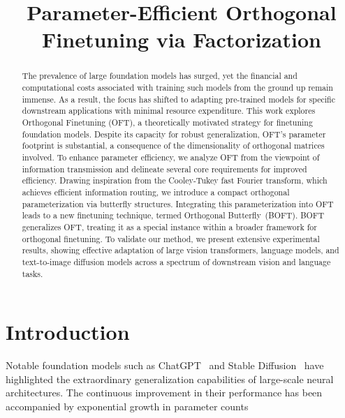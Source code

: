 \title{Parameter-Efficient Orthogonal Finetuning via Factorization}

\begin{abstract}
The prevalence of large foundation models has surged, yet the financial and computational costs associated with training such models from the ground up remain immense. As a result, the focus has shifted to adapting pre-trained models for specific downstream applications with minimal resource expenditure. This work explores Orthogonal Finetuning (OFT), a theoretically motivated strategy for finetuning foundation models. Despite its capacity for robust generalization, OFT’s parameter footprint is substantial, a consequence of the dimensionality of orthogonal matrices involved. To enhance parameter efficiency, we analyze OFT from the viewpoint of information transmission and delineate several core requirements for improved efficiency. Drawing inspiration from the Cooley-Tukey fast Fourier transform, which achieves efficient information routing, we introduce a compact orthogonal parameterization via butterfly structures. Integrating this parameterization into OFT leads to a new finetuning technique, termed Orthogonal Butterfly~(BOFT). BOFT generalizes OFT, treating it as a special instance within a broader framework for orthogonal finetuning. To validate our method, we present extensive experimental results, showing effective adaptation of large vision transformers, language models, and text-to-image diffusion models across a spectrum of downstream vision and language tasks.
\end{abstract}

\section{Introduction}

Notable foundation models such as ChatGPT~\cite{brown2020language,chen2021evaluating} and Stable Diffusion~\cite{rombach2022high} have highlighted the extraordinary generalization capabilities of large-scale neural architectures. The continuous improvement in their performance has been accompanied by exponential growth in parameter counts

